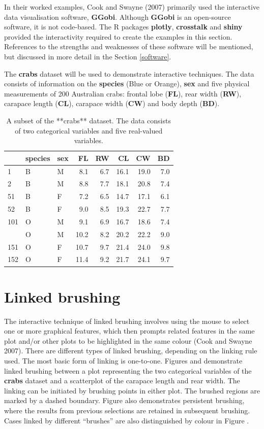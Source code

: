 \documentclass[]{book}
\theoremstyle{definition}
\theoremstyle{definition}
\theoremstyle{definition}
\theoremstyle{remark}
\begin{document}
In their worked examples, Cook and Swayne (2007) primarily used the
interactive data visualisation software, \textbf{GGobi}. Although
\textbf{GGobi} is an open-source software, it is not code-based. The R
packages \textbf{plotly}, \textbf{crosstalk} and \textbf{shiny} provided
the interactivity required to create the examples in this section.
References to the strengths and weaknesses of these software will be
mentioned, but discussed in more detail in the Section \ref{software}.

The \textbf{crabs} dataset will be used to demonstrate interactive
techniques. The data consists of information on the \textbf{species}
(Blue or Orange), \textbf{sex} and five physical measurements of 200
Australian crabs: frontal lobe (\textbf{FL}), rear width (\textbf{RW}),
carapace length (\textbf{CL}), carapace width (\textbf{CW}) and body
depth (\textbf{BD}).

\begin{table}

\caption{\label{tab:crabs}A subset of the **crabs** dataset. The data consists of two categorical variables and five real-valued variables.}
\centering
\begin{tabular}[t]{lllrrrrr}
\toprule
  & species & sex & FL & RW & CL & CW & BD\\
\midrule
1 & B & M & 8.1 & 6.7 & 16.1 & 19.0 & 7.0\\
2 & B & M & 8.8 & 7.7 & 18.1 & 20.8 & 7.4\\
51 & B & F & 7.2 & 6.5 & 14.7 & 17.1 & 6.1\\
52 & B & F & 9.0 & 8.5 & 19.3 & 22.7 & 7.7\\
101 & O & M & 9.1 & 6.9 & 16.7 & 18.6 & 7.4\\
\addlinespace
102 & O & M & 10.2 & 8.2 & 20.2 & 22.2 & 9.0\\
151 & O & F & 10.7 & 9.7 & 21.4 & 24.0 & 9.8\\
152 & O & F & 11.4 & 9.2 & 21.7 & 24.1 & 9.7\\
\bottomrule
\end{tabular}
\end{table}

\section{Linked brushing}\label{linked-brushing}

The interactive technique of linked brushing involves using the mouse to
select one or more graphical features, which then prompts related
features in the same plot and/or other plots to be highlighted in the
same colour (Cook and Swayne 2007). There are different types of linked
brushing, depending on the linking rule used. The most basic form of
linking is one-to-one. Figures and demonstrate linked brushing between a
plot representing the two categorical variables of the \textbf{crabs}
dataset and a scatterplot of the carapace length and rear width. The
linking can be initiated by brushing points in either plot. The brushed
regions are marked by a dashed boundary. Figure also demonstrates
persistent brushing, where the results from previous selections are
retained in subsequent brushing. Cases linked by different ``brushes''
are also distinguished by colour in Figure .
\end{document}
